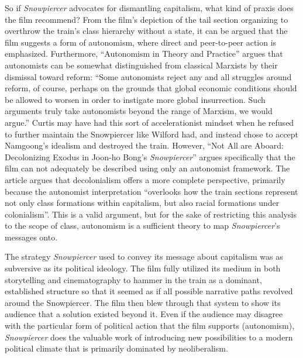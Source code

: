 \documentclass[12pt, letterpaper]{article}
\begin{document}
\begin{mla}
So if \textit{Snowpiercer} advocates for dismantling capitalism, what kind of
praxis does the film recommend? From the film's depiction of the tail section
organizing to overthrow the train's class hierarchy without a state, it can be
argued that the film suggests a form of autonomism, where direct and
peer-to-peer action is emphasized. Furthermore, ``Autonomism in Theory and
Practice'' argues that autonomists can be somewhat distinguished from
classical Marxists by their dismissal toward reform: ``Some autonomists reject
any and all struggles around reform, of course, perhaps on the grounds that
global economic conditions should be allowed to worsen in order to instigate
more global insurrection. Such arguments truly take autonomists beyond the
range of Marxism, we would argue.'' Curtis may have had this sort of
accelerationist mindset when he refused to further maintain the Snowpiercer
like Wilford had, and instead chose to accept Namgoong's idealism and
destroyed the train. However, ``Not All are Aboard: Decolonizing Exodus in
Joon-ho Bong’s \textit{Snowpiercer}'' argues specifically that the film can
not adequately be described using only an autonomist framework. The article
argues that decolonialism offers a more complete perspective, primarily
because the autonomist interpretation ``overlooks how the train sections
represent not only class formations within capitalism, but also racial
formations under colonialism''. This is a valid argument, but for the sake of
restricting this analysis to the scope of class, autonomism is a sufficient
theory to map \textit{Snowpiercer}'s messages onto.

The strategy \textit{Snowpiercer} used to convey its message about capitalism
was as subversive as its political ideology. The film fully utilized its
medium in both storytelling and cinematography to hammer in the train as a
dominant, established structure so that it seemed as if all possible narrative
paths revolved around the Snowpiercer. The film then blew through that system
to show its audience that a solution existed beyond it. Even if the audience
may disagree with the particular form of political action that the film
supports (autonomism), \textit{Snowpiercer} does the valuable work of
introducing new possibilities to a modern political climate that is primarily
dominated by neoliberalism.


\begin{workscited}
\end{workscited}


\end{mla}
\end{document}
